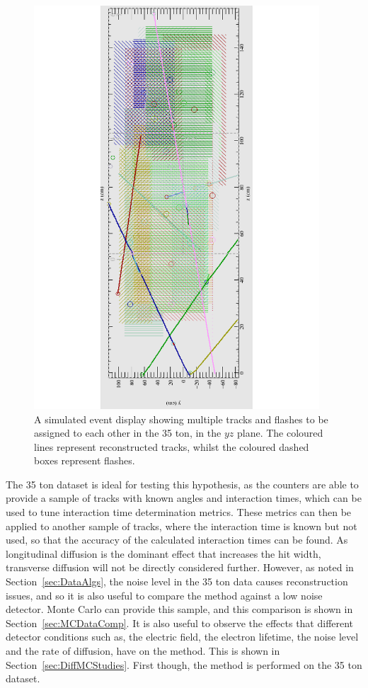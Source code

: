 \begin{figure}[h!]
  \centering
  \includegraphics[width=0.95\textwidth]{LotsOfTrackFlash}
  \caption[A simulated event display showing multiple tracks and flashes in the 35 ton]
          {A simulated event display showing multiple tracks and flashes to be assigned to each other in the 35 ton, in the $yz$ plane. The coloured lines represent reconstructed tracks, whilst the coloured dashed boxes represent flashes.}
          \label{fig:DiffLotsOfFlashes}
\end{figure}

The 35 ton dataset is ideal for testing this hypothesis, as the counters are able to provide a sample of tracks with known angles and interaction times, which can be used to tune interaction time determination metrics. These metrics can then be applied to another sample of tracks, where the interaction time is known but not used, so that the accuracy of the calculated interaction times can be found. As longitudinal diffusion is the dominant effect that increases the hit width, transverse diffusion will not be directly considered further. However, as noted in Section~\ref{sec:DataAlgs}, the noise level in the 35 ton data causes reconstruction issues, and so it is also useful to compare the method against a low noise detector. Monte Carlo can provide this sample, and this comparison is shown in Section~\ref{sec:MCDataComp}. It is also useful to observe the effects that different detector conditions such as, the electric field, the electron lifetime, the noise level and the rate of diffusion, have on the method. This is shown in Section~\ref{sec:DiffMCStudies}. First though, the method is performed on the 35 ton dataset.

